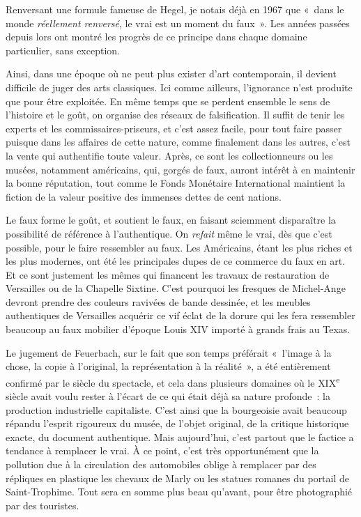 \documentclass[french,twoside]{book} %
\begin{document}
\noindent Renversant une formule fameuse de Hegel, je notais déjà en 1967 que « dans le monde \emph{réellement renversé}, le vrai est un moment du faux ». Les années passées depuis lors ont montré les progrès de ce principe dans chaque domaine particulier, sans exception.\par
Ainsi, dans une époque où ne peut plus exister d’art contemporain, il devient difficile de juger des arts classiques. Ici comme ailleurs, l’ignorance n’est produite que pour être exploitée. En même temps que se perdent ensemble le sens de l’histoire et le goût, on organise des réseaux de falsification. Il suffit de tenir les experts et les commissaires-priseurs, et c’est assez facile, pour tout faire passer puisque dans les affaires de cette nature, comme finalement dans les autres, c’est la vente qui authentifie toute valeur. Après, ce sont les collectionneurs ou les musées, notamment américains, qui, gorgés de faux, auront intérêt à en maintenir la bonne réputation, tout comme le Fonds Monétaire International maintient la fiction de la valeur positive des immenses dettes de cent nations.\par
Le faux forme le goût, et soutient le faux, en faisant sciemment disparaître la possibilité de référence à l’authentique. On \emph{refait} même le vrai, dès que c’est possible, pour le faire ressembler au faux. Les Américains, étant les plus riches et les plus modernes, ont été les principales dupes de ce commerce du faux en art. Et ce sont justement les mêmes qui financent les travaux de restauration de Versailles ou de la Chapelle Sixtine. C’est pourquoi les fresques de Michel-Ange devront prendre des couleurs ravivées de bande dessinée, et les meubles authentiques de Versailles acquérir ce vif éclat de la dorure qui les fera ressembler beaucoup au faux mobilier d’époque Louis XIV importé à grands frais au Texas.\par
Le jugement de Feuerbach, sur le fait que son temps préférait « l’image à la chose, la copie à l’original, la représentation à la réalité », a été entièrement confirmé par le siècle du spectacle, et cela dans plusieurs domaines où le \textsc{XIX}\textsuperscript{e} siècle avait voulu rester à l’écart de ce qui était déjà sa nature profonde : la production industrielle capitaliste. C’est ainsi que la bourgeoisie avait beaucoup répandu l’esprit rigoureux du musée, de l’objet original, de la critique historique exacte, du document authentique. Mais aujourd’hui, c’est partout que le factice a tendance à remplacer le vrai. À ce point, c’est très opportunément que la pollution due à la circulation des automobiles oblige à remplacer par des répliques en plastique les chevaux de Marly ou les statues romanes du portail de Saint-Trophime. Tout sera en somme plus beau qu’avant, pour être photographié par des touristes.\par
\end{document}
